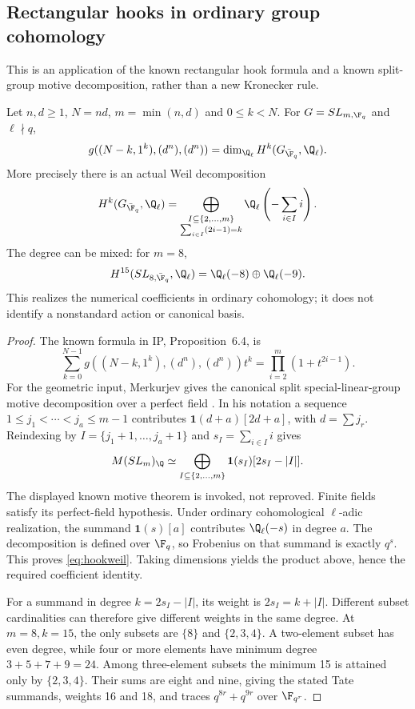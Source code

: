 \subsection{Rectangular hooks in ordinary group cohomology}
This is an application of the known rectangular hook formula and
a known split-group motive decomposition, rather than a new
Kronecker rule.

\begin{finding}\label{f:hookgeometry}
Let $n,d\ge1$, $N=nd$, $m=\min(n,d)$ and $0\le k<N$.
For $G=SL_{m,\F_q}$ and $\ell\nmid q$,
\[
 g((N-k,1^k),(d^n),(d^n))
   =\dim_{\Q_\ell}H^k(G_{\bar{\F}_q},\Q_\ell).
\]
More precisely there is an actual Weil decomposition
\begin{equation}\label{eq:hookweil}
 H^k(G_{\bar{\F}_q},\Q_\ell)=
 \bigoplus_{\substack{I\subseteq\{2,\ldots,m\}\\
                     \sum_{i\in I}(2i-1)=k}}
       \Q_\ell\left(-\sum_{i\in I}i\right).
\end{equation}
The degree can be mixed: for $m=8$,
\[
 H^{15}(SL_{8,\bar{\F}_q},\Q_\ell)
       =\Q_\ell(-8)\oplus\Q_\ell(-9).
\]
This realizes the numerical coefficients in ordinary cohomology;
it does not identify a nonstandard action or canonical basis.
\end{finding}

\begin{proof}
The known formula in IP, Proposition~6.4, is
\[
 \sum_{k=0}^{N-1}g((N-k,1^k),(d^n),(d^n))t^k
       =\prod_{i=2}^m(1+t^{2i-1}).
\]
For the geometric input, Merkurjev gives the canonical split
special-linear-group motive decomposition over a perfect field
\cite[\S5, Corollary~5.5, p.~8; notation on p.~7]{MerkurjevSL}.
In his notation a sequence
$1\le j_1<\cdots<j_a\le m-1$ contributes
$\mathbf1(d+a)[2d+a]$, with $d=\sum j_r$.
Reindexing by $I=\{j_1+1,\ldots,j_a+1\}$ and
$s_I=\sum_{i\in I}i$ gives
\[
 M(SL_m)_{\Q}
       \simeq\bigoplus_{I\subseteq\{2,\ldots,m\}}
                 \mathbf1(s_I)[2s_I-|I|].
\]
The displayed known motive theorem is invoked, not reproved.
Finite fields satisfy its perfect-field hypothesis.
Under ordinary cohomological $\ell$-adic realization, the summand
$\mathbf1(s)[a]$ contributes $\Q_\ell(-s)$ in degree $a$.
The decomposition is defined over $\F_q$, so Frobenius on that
summand is exactly $q^s$. This proves \eqref{eq:hookweil}.
Taking dimensions yields the product above, hence the required
coefficient identity.

For a summand in degree $k=2s_I-|I|$, its weight is
$2s_I=k+|I|$. Different subset cardinalities can therefore give
different weights in the same degree. At $m=8,k=15$, the only
subsets are $\{8\}$ and $\{2,3,4\}$. A two-element subset has
even degree, while four or more elements have minimum degree
$3+5+7+9=24$. Among three-element subsets the minimum 15 is
attained only by $\{2,3,4\}$. Their sums are eight and nine,
giving the stated Tate summands, weights 16 and 18, and traces
$q^{8r}+q^{9r}$ over $\F_{q^r}$.
\end{proof}

